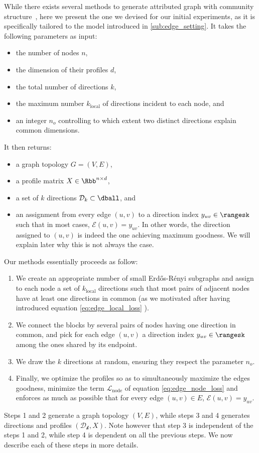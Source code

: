 While there exists several methods to generate attributed graph with community
structure~\autocites{Yang2013}{XuBayesian14}{Kataoka2016}, here we present the one we devised for
our initial experiments, as it is specifically tailored to the model introduced in \autoref{sub:edge_setting}.
It takes the following parameters as input:
\begin{itemize}[nosep]
  \item the number of nodes $n$,
  \item the dimension of their profiles $d$,
  \item the total number of directions $k$,
  \item the maximum number $k_\mathrm{local}$ of directions incident to each node, and
  \item an integer $n_o$ controlling to which extent two distinct directions explain common dimensions.
\end{itemize}
It then returns:
\begin{itemize}[nosep]
  \item a graph topology $G=(V,E)$,
  \item a profile matrix $X\in \Rbb^{n\times d}$,
  \item a set of $k$ directions $\mathcal{D}_k \subset \dball$, and
  \item an assignment from every edge $(u,v)$ to a direction index $y_{uv} \in \rangesk$ such that in
    most cases, $\mathcal{E}(u,v) = y_{uv}$. In other words, the direction assigned to $(u,v)$ is
    indeed the one achieving maximum goodness. We will explain later why this is not always the
    case.
\end{itemize}
Our methods essentially proceeds as follow:
\begin{enumerate}[1),nosep]
  \item We create an appropriate number of small Erdős-Rényi subgraphs and assign to each node a set of
    $k_\mathrm{local}$ directions such that most pairs of adjacent nodes have at least one
    directions in common (as we motivated after having introduced equation \eqref{eq:edge_local_loss}
    ).
  \item We connect the blocks by several pairs of nodes having one direction in common, and pick for
    each edge $(u,v)$ a direction index $y_{uv} \in \rangesk$ among the ones shared by its endpoint.
  \item We draw the $k$ directions at random, ensuring they respect the parameter $n_o$.
  \item Finally, we optimize the profiles so as to simultaneously maximize the edges goodness,
    minimize the term $\mathcal{L}_{\mathrm{node}}$ of equation \eqref{eq:edge_node_loss} and
    enforces as much as possible that for every edge $(u,v) \in E$, $\mathcal{E}(u,v) = y_{uv}$.
\end{enumerate}
Steps 1 and 2 generate a graph topology $(V, E)$, while steps 3 and 4 generates directions and
profiles $(\mathcal{D_k}, X)$. Note however that step 3 is independent of the steps 1 and 2, while
step 4 is dependent on all the previous steps.
We now describe each of these steps in more details.

